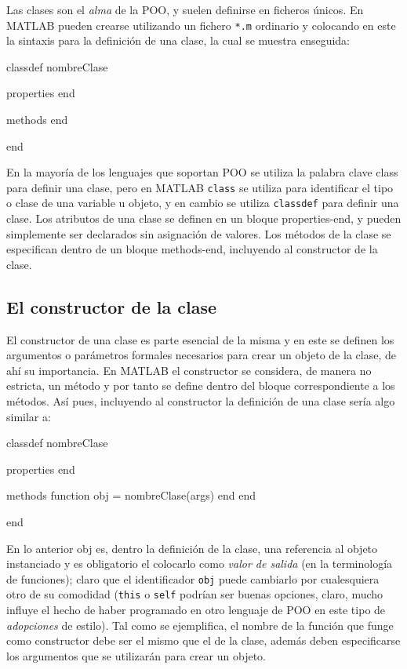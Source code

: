 Las clases son el \emph{alma} de la POO, y suelen definirse en ficheros
únicos. En MATLAB pueden crearse utilizando un fichero \verb|*.m| ordinario y
colocando en este la sintaxis para la definición de una clase, la cual
se muestra enseguida:

\begin{matlab}
classdef nombreClase
    
    properties
    end
    
    methods
    end
    
end
\end{matlab}

En la mayoría de los lenguajes que soportan POO se utiliza la palabra
clave class para definir una clase, pero en MATLAB \texttt{class} se
utiliza para identificar el tipo o clase de una variable u objeto, y en
cambio se utiliza \texttt{classdef} para definir una clase. Los
atributos de una clase se definen en un bloque properties-end, y pueden
simplemente ser declarados sin asignación de valores. Los métodos de la
clase se especifican dentro de un bloque methods-end, incluyendo al
constructor de la clase.

\subsection{El constructor de la clase}\label{el-constructor-de-la-clase}

El constructor de una clase es parte esencial de la misma y en este se
definen los argumentos o parámetros formales necesarios para crear un
objeto de la clase, de ahí su importancia. En MATLAB el constructor se
considera, de manera no estricta, un método y por tanto se define dentro
del bloque correspondiente a los métodos. Así pues, incluyendo al
constructor la definición de una clase sería algo similar a:

\begin{matlab}
classdef nombreClase
    
    properties
    end
    
    methods
        function obj = nombreClase(args)
        end
    end
    
end
\end{matlab}

En lo anterior obj es, dentro la definición de la clase, una referencia
al objeto instanciado y es obligatorio el colocarlo como \emph{valor de
salida} (en la terminología de funciones); claro que el identificador
\texttt{obj} puede cambiarlo por cualesquiera otro de su comodidad
(\texttt{this} o \texttt{self} podrían ser buenas opciones, claro, mucho
influye el hecho de haber programado en otro lenguaje de POO en este
tipo de \emph{adopciones} de estilo). Tal como se ejemplifica, el nombre
de la función que funge como constructor debe ser el mismo que el de la
clase, además deben especificarse los argumentos que se utilizarán para
crear un objeto.

